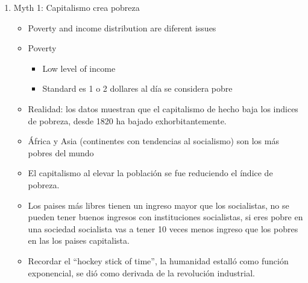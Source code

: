\begin{enumerate}
    \item Myth 1: Capitalismo crea pobreza
    \begin{itemize}
        \item Poverty and income distribution are diferent issues
        \item Poverty
        \begin{itemize}
            \item Low level of income
            \item Standard es 1 o 2 dollares al día se considera pobre
        \end{itemize}
        \item Realidad: los datos muestran que el capitalismo de hecho baja los indices de pobreza, desde 1820 ha bajado exhorbitantemente.
        \item África y Asia (continentes con tendencias al socialismo) son los más pobres del mundo
        \item El capitalismo al elevar la población se fue reduciendo el índice de pobreza.
        \item Los paises más libres tienen un ingreso mayor que los socialistas, no se pueden tener buenos ingresos con instituciones socialistas, si eres pobre en una sociedad socialista vas a tener 10 veces menos ingreso que los pobres en las los paises capitalista.
        \item Recordar el ``hockey stick of time'', la humanidad estalló como función exponencial, se dió  como derivada de la revolución industrial.
    \end{itemize}



\end{enumerate}
